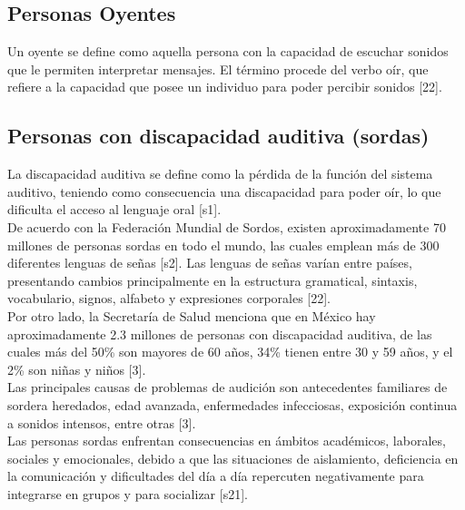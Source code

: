\subsection{Personas Oyentes}
Un oyente se define como aquella persona con la capacidad de escuchar sonidos que le permiten interpretar mensajes. El término procede del verbo oír, que refiere a la capacidad que posee un individuo para poder percibir sonidos [22].

\subsection{Personas con discapacidad auditiva (sordas)}
La discapacidad auditiva se define como la pérdida de la función del sistema auditivo, teniendo como consecuencia una discapacidad para poder oír, lo que dificulta el acceso al lenguaje oral [s1].\\ 

De acuerdo con la Federación Mundial de Sordos, existen aproximadamente 70 millones de personas sordas en todo el mundo, las cuales emplean más de 300 diferentes lenguas de señas [s2]. Las lenguas de señas varían entre países, presentando cambios principalmente en la estructura gramatical, sintaxis, vocabulario, signos, alfabeto y expresiones corporales [22].\\

Por otro lado, la Secretaría de Salud menciona que en México hay aproximadamente 2.3 millones de personas con discapacidad auditiva, de las cuales más del 50\% son mayores de 60 años, 34\% tienen entre 30 y 59 años, y el 2\% son niñas y niños [3].\\

Las principales causas de problemas de audición son antecedentes familiares de sordera heredados, edad avanzada, enfermedades infecciosas, exposición continua a sonidos intensos, entre otras [3].\\

Las personas sordas enfrentan consecuencias en ámbitos académicos, laborales, sociales y emocionales, debido a que las situaciones de aislamiento, deficiencia en la comunicación y dificultades del día a día repercuten negativamente para integrarse en grupos y para socializar [s21]. \\

